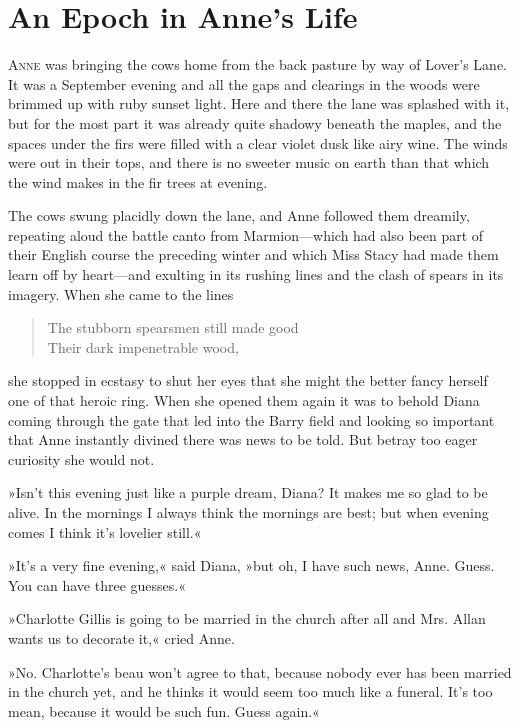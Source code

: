 \chapter{An Epoch in Anne’s Life}

\lettrine[lines=4]{A}{nne} was bringing the cows home from the back pasture by way of Lover’s Lane. It was a September evening and all the gaps and clearings in the woods were brimmed up with ruby sunset light. Here and there the lane was splashed with it, but for the most part it was already quite shadowy beneath the maples, and the spaces under the firs were filled with a clear violet dusk like airy wine. The winds were out in their tops, and there is no sweeter music on earth than that which the wind makes in the fir trees at evening.

The cows swung placidly down the lane, and Anne followed them dreamily, repeating aloud the battle canto from Marmion—which had also been part of their English course the preceding winter and which Miss Stacy had made them learn off by heart—and exulting in its rushing lines and the clash of spears in its imagery. When she came to the lines

\begin{verse}
The stubborn spearsmen still made good\\
Their dark impenetrable wood,\\
\end{verse}

she stopped in ecstasy to shut her eyes that she might the better fancy herself one of that heroic ring. When she opened them again it was to behold Diana coming through the gate that led into the Barry field and looking so important that Anne instantly divined there was news to be told. But betray too eager curiosity she would not.

»Isn’t this evening just like a purple dream, Diana? It makes me so glad to be alive. In the mornings I always think the mornings are best; but when evening comes I think it’s lovelier still.«

»It’s a very fine evening,« said Diana, »but oh, I have such news, Anne. Guess. You can have three guesses.«

»Charlotte Gillis is going to be married in the church after all and Mrs. Allan wants us to decorate it,« cried Anne.

»No. Charlotte’s beau won’t agree to that, because nobody ever has been married in the church yet, and he thinks it would seem too much like a funeral. It’s too mean, because it would be such fun. Guess again.«


